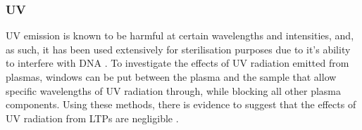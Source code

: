 \documentclass[11pt, oneside]{article}   	%
\newcommand{\todo}[1]{ \textcolor{red}{\bf{To Do:} #1}}
\begin{document}
%
%


\subsubsection{UV}
UV emission is known to be harmful at certain wavelengths and intensities, and, as such, it has been used extensively for sterilisation purposes due to it's ability to interfere with DNA \cite{Laroussi2004evaluation}.
To investigate the effects of UV radiation emitted from plasmas, windows can be put between the plasma and the sample that allow specific wavelengths of UV radiation through, while blocking all other plasma components. 
Using these methods, there is evidence to suggest that the effects of UV radiation from LTPs are negligible \cite{Laroussi2004evaluation, Dobrynin2009physical}.
\end{document}
